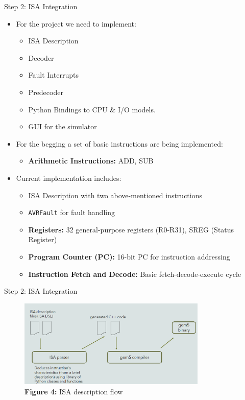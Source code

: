 \begin{frame}{Step 2: ISA Integration}
	\begin{itemize}
		\item For the project we need to implement:
		      \begin{itemize}
			      \item ISA Description
			      \item Decoder
			      \item Fault Interrupts
			      \item Predecoder
			      \item Python Bindings to CPU \& I/O models.
			      \item GUI for the simulator
		      \end{itemize}
		\item For the begging a set of basic instructions are being implemented:
		      \begin{itemize}
			      \item \textbf{Arithmetic Instructions:} ADD, SUB
		      \end{itemize}
		\item Current implementation includes:
		      \begin{itemize}
			      \item ISA Description with two above-mentioned instructions
			      \item \texttt{AVRFault} for fault handling
			      \item \textbf{Registers:} 32 general-purpose registers (R0-R31), SREG (Status Register)
			      \item \textbf{Program Counter (PC):} 16-bit PC for instruction addressing
			      \item \textbf{Instruction Fetch and Decode:} Basic fetch-decode-execute cycle
		      \end{itemize}
	\end{itemize}
\end{frame}

\begin{frame}[fragile]{Step 2: ISA Integration}
	\begin{figure}
		\centering
		\includegraphics[width=0.8\textwidth]{images/flow.png}\\
		\textbf{Figure 4:} ISA description flow
	\end{figure}
\end{frame}

